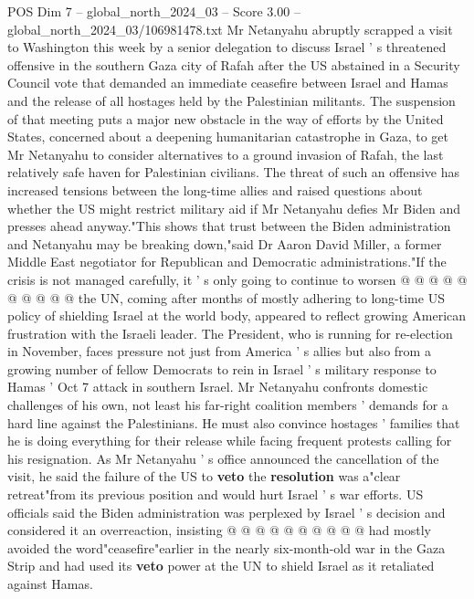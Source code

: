 \begin{textsample}{POS Dim 7 – global\_north\_2024\_03 – Score 3.00 – global\_north\_2024\_03/106981478.txt}  \label{ex:f7_pos_211}
Mr Netanyahu abruptly scrapped a visit to Washington this week by a senior delegation to discuss Israel ' s threatened offensive in the southern Gaza city of Rafah after the US abstained in a Security Council vote that demanded an immediate ceasefire between Israel and Hamas and the release of all hostages held by the Palestinian militants.
The suspension of that meeting puts a major new obstacle in the way of efforts by the United States, concerned about a deepening humanitarian catastrophe in Gaza, to get Mr Netanyahu to consider alternatives to a ground invasion of Rafah, the last relatively safe haven for Palestinian civilians.
The threat of such an offensive has increased tensions between the long-time allies and raised questions about whether the US might restrict military aid if Mr Netanyahu defies Mr Biden and presses ahead anyway."This shows that trust between the Biden administration and Netanyahu may be breaking down,"said Dr Aaron David Miller, a former Middle East negotiator for Republican and Democratic administrations."If the crisis is not managed carefully, it ' s only going to continue to worsen @ @ @ @ @ @ @ @ @ @ the UN, coming after months of mostly adhering to long-time US policy of shielding Israel at the world body, appeared to reflect growing American frustration with the Israeli leader.
The President, who is running for re-election in November, faces pressure not just from America ' s allies but also from a growing number of fellow Democrats to rein in Israel ' s military response to Hamas ' Oct 7 attack in southern Israel.
Mr Netanyahu confronts domestic challenges of his own, not least his far-right coalition members ' demands for a hard line against the Palestinians.
He must also convince hostages ' families that he is doing everything for their release while facing frequent protests calling for his resignation.
As Mr Netanyahu ' s office announced the cancellation of the visit, he said the failure of the US to \textbf{veto} the \textbf{resolution} was a"clear retreat"from its previous position and would hurt Israel ' s war efforts.
US officials said the Biden administration was perplexed by Israel ' s decision and considered it an overreaction, insisting @ @ @ @ @ @ @ @ @ @ had mostly avoided the word"ceasefire"earlier in the nearly six-month-old war in the Gaza Strip and had used its \textbf{veto} power at the UN to shield Israel as it retaliated against Hamas.

\end{textsample}
